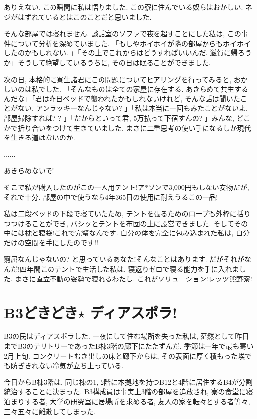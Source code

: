 \documentclass[10pt,b5jsbook,dvips,dvipdfmx,openany]{jsbook}
\theoremstyle{definition}
\begin{document}
    ありえない. この瞬間に私は悟りました. この寮に住んでいる奴らはおかしい. ネジがはずれているとはこのことだと思いました.

    そんな部屋では寝れません. 談話室のソファで夜を超すことにした私は, この事件について分析を深めていました. 「もしやホイホイが隣の部屋からもホイホイしたのかもしれない. 」「その上でこれからはどうすればいいんだ. 滋賀に帰ろうか」そうして絶望しているうちに, その日は眠ることができました.

    次の日, 本格的に寮生諸君にこの問題についてヒアリングを行ってみると, おかしいのは私でした. 「そんなものは全ての家屋に存在する. あきらめて共生するんだな」「君は昨日ベッドで襲われたかもしれないけれど, そんな話は聞いたことがない. アンラッキーなんじゃない? 」「私は本当に一回もみたことがないよ. 部屋掃除すれば? ? 」「だからといって君, 5万払って下宿すんの? 」みんな, どこかで折り合いをつけて生きていました. まさに二重思考の使い手になるしか現代を生きる道はないのか.

    ......

    あきらめないで!

    そこで私が購入したのがこの一人用テント!ア*ゾンで3,000円もしない安物だが, それで十分. 部屋の中で使うなら4年365日の使用に耐えうるこの一品!

    私は二段ベッドの下段で寝ていたため, テントを張るためのロープも外枠に括りつつけることができ, バシッとテントを布団の上に設営できました. そしてその中には枕と寝袋!これで完璧なんです. 自分の体を完全に包み込まれた私は, 自分だけの空間を手にしたのです!!

    窮屈なんじゃないの? と思っているあなた!そんなことはあります. だがそれがなんだ!四年間このテントで生活した私は, 寝返りゼロで寝る能力を手に入れました. まさに直立不動の姿勢で寝れるわたし. これがソリューション!レッツ熊野寮!




	\section{B3どきどき$ \star$ ディアスポラ! }

	B3の民はディアスポラした. 一夜にして住む場所を失った私は, 茫然として昨日までB3のテリトリーであったB棟3階の廊下にたたずんだ. 季節は一年で最も寒い2月上旬. コンクリートむき出しの床と廊下からは, その表面に厚く積もった埃でも防ぎきれない冷気が立ち上っている.

	今日からB棟3階は, 同じ棟の1, 2階に本拠地を持つB12と4階に居住するB4が分割統治することに決まった. B3構成員は事実上3階の部屋を追放され, 寮の食堂に寝泊まりする者, 大学の研究室に居場所を求める者, 友人の家を転々とする者等々, 三々五々に離散してしまった.
\end{document}
